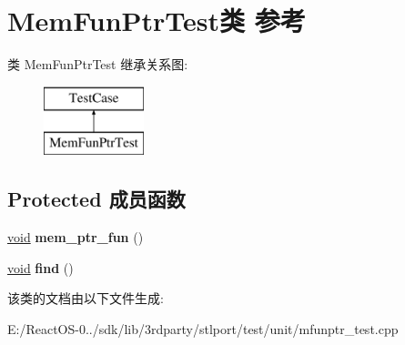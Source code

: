 \hypertarget{class_mem_fun_ptr_test}{}\section{Mem\+Fun\+Ptr\+Test类 参考}
\label{class_mem_fun_ptr_test}
类 Mem\+Fun\+Ptr\+Test 继承关系图\+:\begin{figure}[H]
\begin{center}
\leavevmode
\includegraphics[height=2.000000cm]{class_mem_fun_ptr_test}
\end{center}
\end{figure}
\subsection*{Protected 成员函数}
\begin{DoxyCompactItemize}
\item 
\mbox{\label{class_mem_fun_ptr_test_a731765c59a9f937da617d5f2b093bb64}} 
\hyperlink{interfacevoid}{void} {\bfseries mem\+\_\+ptr\+\_\+fun} ()
\item 
\mbox{\label{class_mem_fun_ptr_test_adf59f2ff0ac8ee8456edc4b92992c55e}} 
\hyperlink{interfacevoid}{void} {\bfseries find} ()
\end{DoxyCompactItemize}


该类的文档由以下文件生成\+:\begin{DoxyCompactItemize}
\item 
E\+:/\+React\+O\+S-\/0../sdk/lib/3rdparty/stlport/test/unit/mfunptr\+\_\+test.\+cpp\end{DoxyCompactItemize}
